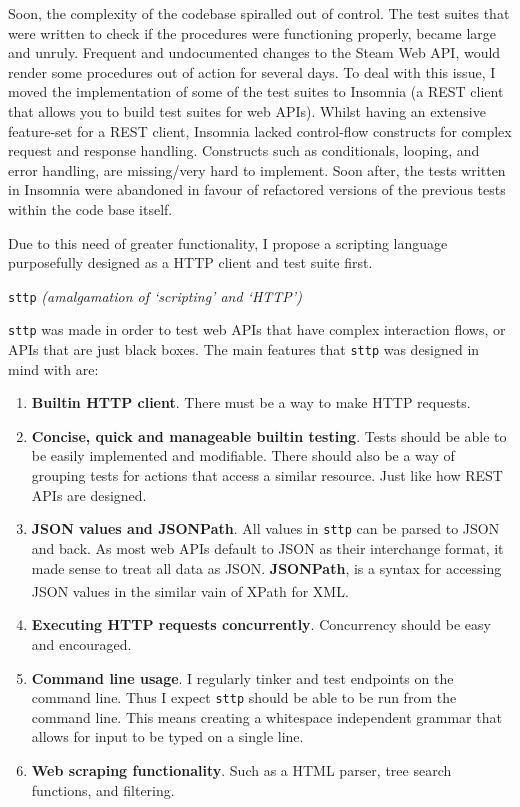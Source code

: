 \documentclass[]{full}
\theoremstyle{definition}
\begin{document}
Soon, the complexity of the codebase spiralled out of control. The test suites that were written to check if the procedures were functioning properly, became large and unruly. Frequent and undocumented changes to the Steam Web API, would render some procedures out of action for several days. To deal with this issue, I moved the implementation of some of the test suites to Insomnia (a REST client that allows you to build test suites for web APIs). Whilst having an extensive feature-set for a REST client, Insomnia lacked control-flow constructs for complex request and response handling. Constructs such as conditionals, looping, and error handling, are missing/very hard to implement. Soon after, the tests written in Insomnia were abandoned in favour of refactored versions of the previous tests within the code base itself.

Due to this need of greater functionality, I propose a scripting language purposefully designed as a HTTP client and test suite first.

\begin{center}
\verb|sttp| \textit{(amalgamation of `scripting' and `HTTP')}
\end{center}

\verb|sttp| was made in order to test web APIs that have complex interaction flows, or APIs that are just black boxes. The main features that \verb|sttp| was designed in mind with are:

\begin{enumerate}
    \item \textbf{Builtin HTTP client}. There must be a way to make HTTP requests.
    \item \textbf{Concise, quick and manageable builtin testing}. Tests should be able to be easily implemented and modifiable. There should also be a way of grouping tests for actions that access a similar resource. Just like how REST APIs are designed.
    \item \textbf{JSON values and JSONPath}. All values in \verb|sttp| can be parsed to JSON and back. As most web APIs default to JSON as their interchange format, it made sense to treat all data as JSON. \textbf{JSONPath}, is a syntax for accessing JSON values in the similar vain of XPath for XML\textsuperscript{\cite{goessner_2007}}.
    \item \textbf{Executing HTTP requests concurrently}. Concurrency should be easy and encouraged.
    \item \textbf{Command line usage}. I regularly tinker and test endpoints on the command line. Thus I expect \verb|sttp| should be able to be run from the command line. This means creating a whitespace independent grammar that allows for input to be typed on a single line.
    \item \textbf{Web scraping functionality}. Such as a HTML parser, tree search functions, and filtering.
\end{enumerate}
\end{document}
